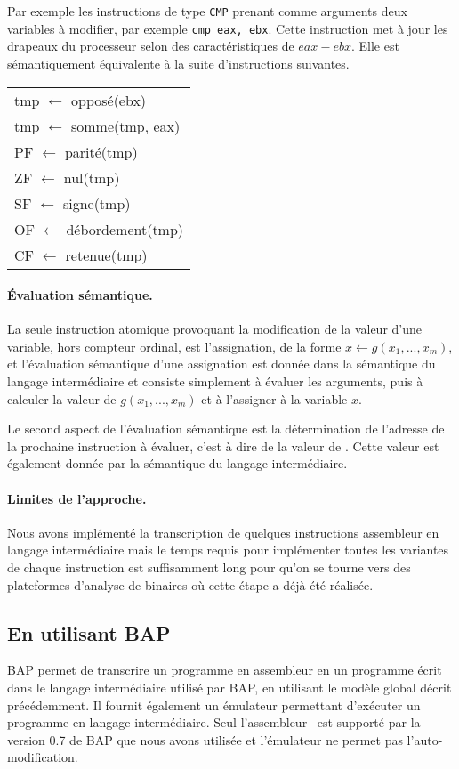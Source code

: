 Par exemple les instructions de type \texttt{CMP} prenant comme arguments deux variables à modifier, par exemple \texttt{cmp eax, ebx}.
Cette instruction met à jour les drapeaux du processeur selon des caractéristiques de $eax-ebx$.
Elle est sémantiquement équivalente à la suite d'instructions suivantes.
\begin{center}
\begin{tabular}[b]{l}
tmp $\leftarrow$ opposé(ebx)\\
tmp $\leftarrow$ somme(tmp, eax)\\
PF $\leftarrow$ parité(tmp) \\
ZF $\leftarrow$ nul(tmp) \\
SF $\leftarrow$ signe(tmp) \\
OF $\leftarrow$ débordement(tmp) \\
CF $\leftarrow$ retenue(tmp)
\end{tabular}
\end{center}

\paragraph{Évaluation sémantique.}
La seule instruction atomique provoquant la modification de la valeur d'une variable, hors compteur ordinal, est l'assignation, de la forme $x\leftarrow g(x_1, ..., x_m)$, et l'évaluation sémantique d'une assignation est donnée dans la sémantique du langage intermédiaire et consiste simplement à évaluer les arguments, puis à calculer la valeur de $g(x_1, ..., x_m)$ et à l'assigner à la variable $x$.

Le second aspect de l'évaluation sémantique est la détermination de l'adresse de la prochaine instruction à évaluer, c'est à dire de la valeur de \eip. Cette valeur est également donnée par la sémantique du langage intermédiaire.

\paragraph{Limites de l'approche.}
Nous avons implémenté la transcription de quelques instructions assembleur en langage intermédiaire mais le temps requis pour implémenter toutes les variantes de chaque instruction est suffisamment long pour qu'on se tourne vers des plateformes d'analyse de binaires où cette étape a déjà été réalisée.


\subsection{En utilisant BAP}
BAP permet de transcrire un programme en assembleur en un programme écrit dans le langage intermédiaire utilisé par BAP, en utilisant le modèle global décrit précédemment.
Il fournit également un émulateur permettant d'exécuter un programme en langage intermédiaire.
Seul l'assembleur \xq\ est supporté par la version 0.7 de BAP que nous avons utilisée et l'émulateur ne permet pas l'auto-modification.

